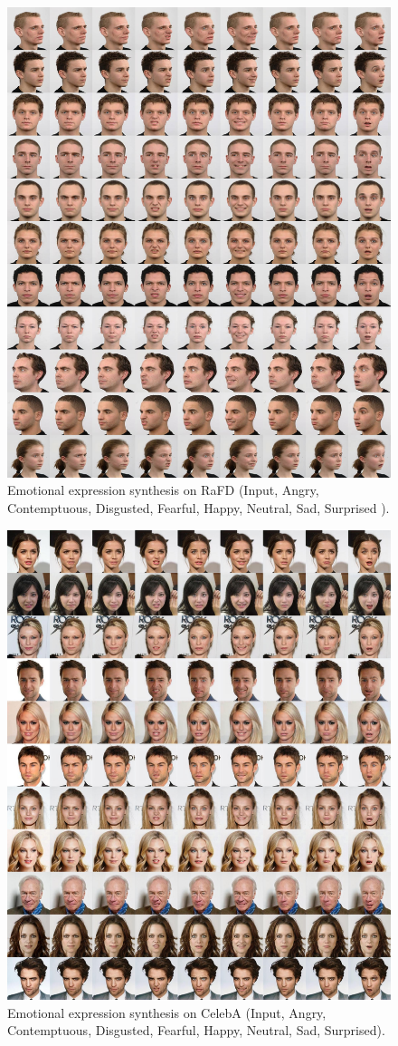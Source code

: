 \documentclass[10pt,twocolumn,letterpaper]{article}
\begin{document}
\begin{figure}[h]
\centering
\centerline{\includegraphics[width=1.0\linewidth]{images/supple_rafd2-min.jpg}}
\caption{Emotional expression synthesis on RaFD (Input, Angry, Contemptuous, Disgusted, Fearful, Happy, Neutral, Sad, Surprised ).}
\label{figure11}
\end{figure}

\begin{figure}[h]
\centering
\centerline{\includegraphics[width=1.0\linewidth]{images/supple_CelebA_expr.jpg}}
\caption{Emotional expression synthesis on CelebA (Input, Angry, Contemptuous, Disgusted, Fearful, Happy, Neutral, Sad, Surprised).}
\label{figure12}
\end{figure}
\end{document}

